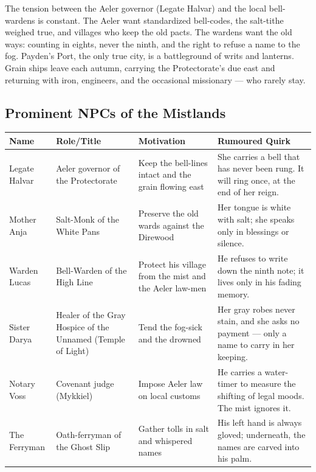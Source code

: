 The tension between the Aeler governor (Legate Halvar) and the local bell-wardens is constant. The Aeler want standardized bell-codes, the salt-tithe weighed true, and villages who keep the old pacts. The wardens want the old ways: counting in eights, never the ninth, and the right to refuse a name to the fog. Payden's Port, the only true city, is a battleground of writs and lanterns. Grain ships leave each autumn, carrying the Protectorate's due east and returning with iron, engineers, and the occasional missionary --- who rarely stay.

\subsection*{Prominent NPCs of the Mistlands}
\label{sec:mistlands-npcs}

\begin{longtable}{|p{}|p{}|p{}|p{}|}
\hline
\textbf{Name} & \textbf{Role/Title} & \textbf{Motivation} & \textbf{Rumoured Quirk} \\
\hline
Legate Halvar & Aeler governor of the Protectorate & Keep the bell-lines intact and the grain flowing east & She carries a bell that has never been rung. It will ring once, at the end of her reign. \\
\hline
Mother Anja & Salt-Monk of the White Pans & Preserve the old wards against the Direwood & Her tongue is white with salt; she speaks only in blessings or silence. \\
\hline
Warden Lucas & Bell-Warden of the High Line & Protect his village from the mist and the Aeler law-men & He refuses to write down the ninth note; it lives only in his fading memory. \\
\hline
Sister Darya & Healer of the Gray Hospice of the Unnamed (Temple of Light) & Tend the fog-sick and the drowned & Her gray robes never stain, and she asks no payment --- only a name to carry in her keeping. \\
\hline
Notary Voss & Covenant judge (Mykkiel) & Impose Aeler law on local customs & He carries a water-timer to measure the shifting of legal moods. The mist ignores it. \\
\hline
The Ferryman & Oath-ferryman of the Ghost Slip & Gather tolls in salt and whispered names & His left hand is always gloved; underneath, the names are carved into his palm. \\
\hline
\end{longtable}


